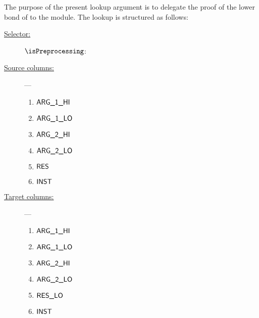 The purpose of the present lookup argument is to delegate the proof of the lower bond of \blockHashArgument{} to the \wcpMod{} module.
The lookup is structured as follows:
\begin{description}
	\item[\underline{Selector:}] $\isPreprocessing$:
	\item[\underline{Source columns:}] ---
		\begin{multicols}{3}
			\begin{enumerate}
				\item $\textsf{ARG}\textsf{\_1}\textsf{\_HI}$
				\item $\textsf{ARG}\textsf{\_1}\textsf{\_LO}$
				\item $\textsf{ARG}\textsf{\_2}\textsf{\_HI}$
				\item $\textsf{ARG}\textsf{\_2}\textsf{\_LO}$
				\item $\textsf{RES}$
				\item $\textsf{INST}$
			\end{enumerate}
		\end{multicols}
	\item[\underline{Target columns:}] ---
		\begin{multicols}{3}
		\begin{enumerate}
			\item $\textsf{ARG}\textsf{\_1}\textsf{\_HI}$
			\item $\textsf{ARG}\textsf{\_1}\textsf{\_LO}$
			\item $\textsf{ARG}\textsf{\_2}\textsf{\_HI}$
			\item $\textsf{ARG}\textsf{\_2}\textsf{\_LO}$
			\item $\textsf{RES}\textsf{\_LO}$
			\item $\textsf{INST}$
		\end{enumerate}
		\end{multicols}
\end{description}
